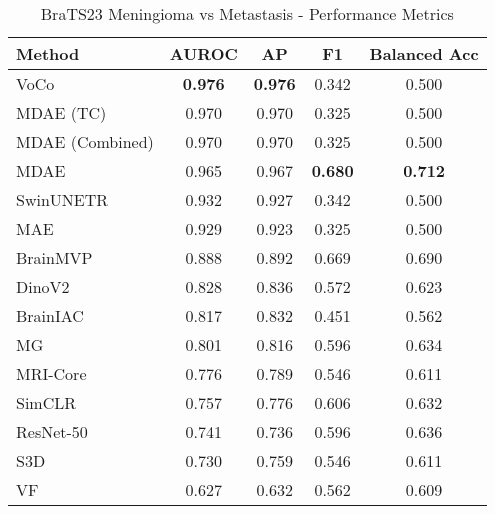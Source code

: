 \begin{table}[ht]
\centering
\caption{BraTS23 Meningioma vs Metastasis - Performance Metrics}
\label{tab:brats23_men_vs_met}
\begin{tabular}{lcccc}
\toprule
Method & AUROC & AP & F1 & Balanced Acc \\
\midrule
VoCo & \textbf{0.976} & \textbf{0.976} & 0.342 & 0.500 \\
MDAE (TC) & 0.970 & 0.970 & 0.325 & 0.500 \\
MDAE (Combined) & 0.970 & 0.970 & 0.325 & 0.500 \\
MDAE & 0.965 & 0.967 & \textbf{0.680} & \textbf{0.712} \\
SwinUNETR & 0.932 & 0.927 & 0.342 & 0.500 \\
MAE & 0.929 & 0.923 & 0.325 & 0.500 \\
BrainMVP & 0.888 & 0.892 & 0.669 & 0.690 \\
DinoV2 & 0.828 & 0.836 & 0.572 & 0.623 \\
BrainIAC & 0.817 & 0.832 & 0.451 & 0.562 \\
MG & 0.801 & 0.816 & 0.596 & 0.634 \\
MRI-Core & 0.776 & 0.789 & 0.546 & 0.611 \\
SimCLR & 0.757 & 0.776 & 0.606 & 0.632 \\
ResNet-50 & 0.741 & 0.736 & 0.596 & 0.636 \\
S3D & 0.730 & 0.759 & 0.546 & 0.611 \\
VF & 0.627 & 0.632 & 0.562 & 0.609 \\
\bottomrule
\end{tabular}
\end{table}
